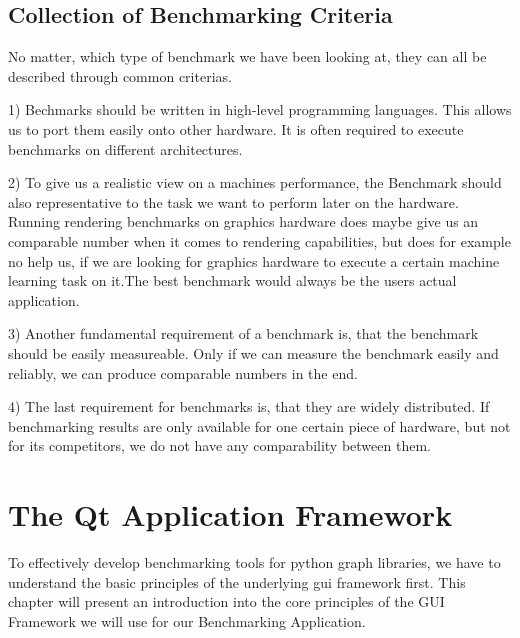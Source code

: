 
\subsection{Collection of Benchmarking Criteria}

No matter, which type of benchmark we have been looking at, they can all be described through common criterias.

1) Bechmarks should be written in high-level programming languages. This allows us to port them easily onto other hardware. It is often required to execute benchmarks on different architectures.

2) To give us a realistic view on a machines performance, the Benchmark should also representative to the task we want to perform later on the hardware. Running rendering benchmarks on graphics hardware does maybe give us an comparable number when it comes to rendering capabilities, but does for example no help us, if we are looking for graphics hardware to execute a certain machine learning task on it.The best benchmark would always be the users actual application.

3) Another fundamental requirement of a benchmark is, that the benchmark should be easily measureable. Only if we can measure the benchmark easily and reliably, we can produce comparable numbers in the end. 

4) The last requirement for benchmarks is, that they are widely distributed. If benchmarking results are only available for one certain piece of hardware, but not for its competitors, we do not have any comparability between them.





\section{The Qt Application Framework}
\label{sec:fundamentals:qt}

To effectively develop benchmarking tools for python graph libraries, we have to understand the basic principles of the underlying \gls{gui} framework first. This chapter will present an introduction into the core principles of the GUI Framework we will use for our Benchmarking Application.




